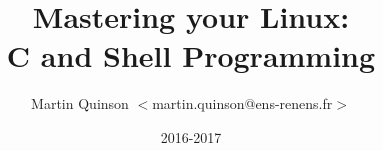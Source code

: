 \documentclass[10pt]{beamer}        %
\title{Mastering your Linux: \\
  C and Shell Programming }
\author[Martin Quinson]{Martin Quinson \normalsize{$<$martin.quinson@ens-renens.fr$>$}}
\institute[]{ENS Rennes -- L3 mécatro}
\date{2016-2017}
\begin{document}
\begin{frame}{}
  \titlepage
\end{frame}






\end{document}
